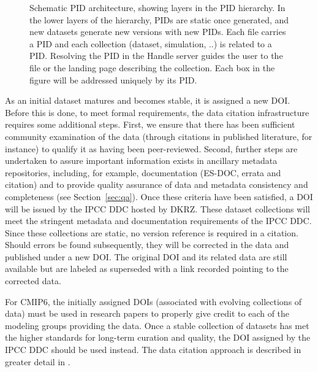 \documentclass[gmd,manuscript]{copernicus}
\begin{document}
\begin{figure*}
  \begin{center}
  \end{center}
  \caption{Schematic PID architecture, showing layers in the PID
    hierarchy. In the lower layers of the hierarchy, PIDs are static
    once generated, and new datasets generate new versions with new
    PIDs. Each file carries a PID and each collection (dataset,
    simulation, ..) is related to a PID. Resolving the PID in the
    Handle server guides the user to the file or the landing page
    describing the collection. Each box in the figure will be
    addressed uniquely by its PID.}
  \label{fig:pidarch}
\end{figure*}

As an initial dataset matures and becomes stable, it is assigned a new
DOI. Before this is done, to meet formal requirements, the data citation infrastructure
requires some additional steps.  First, we
ensure that there has been sufficient community examination of the
data
(through citations in published literature, for instance) to qualify
it as having been peer-reviewed. Second, further steps are undertaken
to assure important information exists in ancillary metadata
repositories, including, for example, documentation (ES-DOC, errata
and citation) and to provide quality assurance of data and metadata
consistency and completeness (see Section~\ref{sec:qa}). Once these
criteria have been satisfied, a DOI will be issued by the IPCC DDC
hosted by DKRZ. These dataset collections will meet the stringent
metadata and documentation requirements of the IPCC DDC. Since these
collections are static, no version reference is required in a
citation.
Should errors be found subsequently, they will be corrected in the
data and published under a new DOI. The original DOI and its related
data are still available but are labeled as superseded with a link recorded
pointing to the corrected data.

For CMIP6, the initially assigned DOIs (associated with evolving
collections of data) must be used in research papers to properly give
credit to each of the modeling groups providing the data. Once a
stable collection of datasets has met the higher standards for
long-term curation and quality, the DOI assigned by the IPCC DDC
should be used instead.
The data citation approach is described in greater detail in \cite{ref:stockhauselautenschlager2017}.
\end{document}
